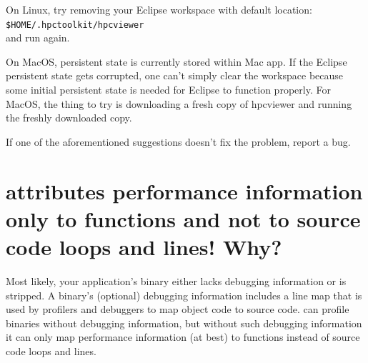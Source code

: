 \documentclass[11pt,letterpaper]{report}
\begin{document}
On Linux, try removing your \hpcviewer{} Eclipse workspace with default location:\\
 \texttt{\$HOME/.hpctoolkit/hpcviewer} \\
 and run \hpcviewer{} again.  

On MacOS, persistent state is currently stored within Mac app. If the Eclipse persistent state gets corrupted, one can't simply clear the workspace because some initial persistent state is needed for Eclipse to function properly.  For MacOS, the thing to try is downloading a fresh copy of hpcviewer and running the freshly downloaded copy.

If one of the aforementioned suggestions doesn’t fix the problem, report a bug.


\section{\hpcviewer{} attributes performance information only to functions and not to source code loops and lines! Why?}
\label{sec:troubleshooting:debug-info}

Most likely, your application's binary either lacks debugging information or is stripped.
A binary's (optional) debugging information includes a line map that is used by profilers and debuggers to map object code to source code.
\HPCToolkit{} can profile binaries without debugging information, but without such debugging information it can only map performance information (at best) to functions instead of source code loops and lines.
\end{document}
